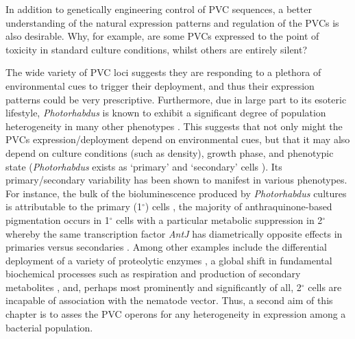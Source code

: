 In addition to genetically engineering control of PVC sequences, a better understanding of the natural expression patterns and regulation of the PVCs is also desirable. Why, for example, are some PVCs expressed to the point of toxicity in standard culture conditions, whilst others are entirely silent?

The wide variety of PVC loci suggests they are responding to a plethora of environmental cues to trigger their deployment, and thus their expression patterns could be very prescriptive. Furthermore, due in large part to its esoteric lifestyle, \emph{Photorhabdus} is known to exhibit a significant degree of population heterogeneity in many other phenotypes \citep{Langer2017, Heinrich2016}. This suggests that not only might the PVCs expression/deployment depend on environmental cues, but that it may also depend on culture conditions (such as density), growth phase, and phenotypic state (\emph{Photorhabdus} exists as `primary' and `secondary' cells \citep{Boemare1988}). Its primary/secondary variability has been shown to manifest in various phenotypes. For instance, the bulk of the bioluminescence produced by \emph{Photorhabdus} cultures is attributable to the primary (1$^{\circ}$) cells \citep{Boemare1988, AKHURST1980}, the majority of anthraquinone-based pigmentation occurs in 1$^{\circ}$ cells  with a particular metabolic suppression in 2$^{\circ}$ whereby the same transcription factor \emph{AntJ} has diametrically opposite effects in primaries versus secondaries \citep{Heinrich2016, Langer2017}. Among other examples include the differential deployment of a variety of proteolytic enzymes \citep{Marokhazi2004}, a global shift in fundamental biochemical processes such as respiration \citep{Smigielski1994} and production of secondary metabolites \citep{Turlin2006}, and, perhaps most prominently and significantly of all, 2$^{\circ}$ cells are incapable of association with the nematode vector. Thus, a second aim of this chapter is to asses the PVC operons for any heterogeneity in expression among a bacterial population.

